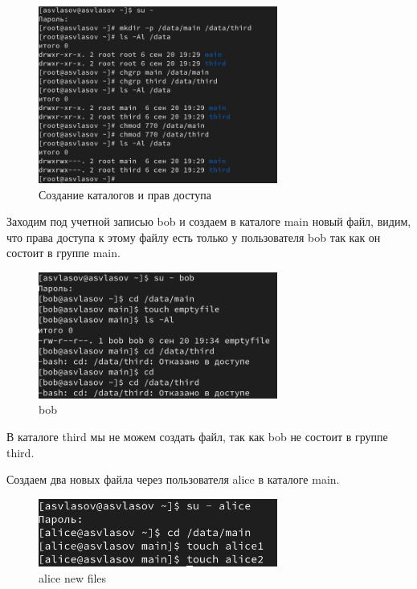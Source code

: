\documentclass[
  12pt,
  a4paper,
  DIV=11,
  numbers=noendperiod]{scrreprt}
\begin{document}
\begin{figure}

{\centering \includegraphics[width=0.7\textwidth,height=\textheight]{image/1.png}

}

\caption{Создание каталогов и прав доступа}

\end{figure}%

Заходим под учетной записью bob и создаем в каталоге main новый файл,
видим, что права доступа к этому файлу есть только у пользователя bob
так как он состоит в группе main.

\begin{figure}

{\centering \includegraphics[width=0.7\textwidth,height=\textheight]{image/2.png}

}

\caption{bob}

\end{figure}%

В каталоге third мы не можем создать файл, так как bob не состоит в
группе third.

Создаем два новых файла через пользователя alice в каталоге main.

\begin{figure}

{\centering \includegraphics[width=0.7\textwidth,height=\textheight]{image/3.png}

}

\caption{alice new files}

\end{figure}%
\end{document}
